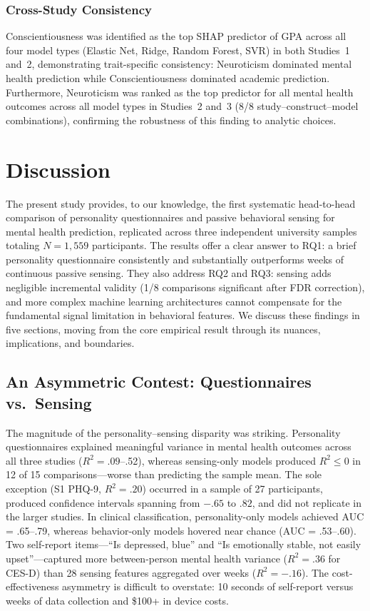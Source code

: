 \documentclass[12pt, a4paper]{article}
\begin{document}
\subsubsection{Cross-Study Consistency}

Conscientiousness was identified as the top SHAP predictor of GPA across all four model types (Elastic Net, Ridge, Random Forest, SVR) in both Studies~1 and~2, demonstrating trait-specific consistency: Neuroticism dominated mental health prediction while Conscientiousness dominated academic prediction. Furthermore, Neuroticism was ranked as the top predictor for all mental health outcomes across all model types in Studies~2 and~3 (8/8 study--construct--model combinations), confirming the robustness of this finding to analytic choices.

\section{Discussion}

The present study provides, to our knowledge, the first systematic head-to-head comparison of personality questionnaires and passive behavioral sensing for mental health prediction, replicated across three independent university samples totaling $N = 1{,}559$ participants. The results offer a clear answer to RQ1: a brief personality questionnaire consistently and substantially outperforms weeks of continuous passive sensing. They also address RQ2 and RQ3: sensing adds negligible incremental validity (1/8 comparisons significant after FDR correction), and more complex machine learning architectures cannot compensate for the fundamental signal limitation in behavioral features. We discuss these findings in five sections, moving from the core empirical result through its nuances, implications, and boundaries.

\subsection{An Asymmetric Contest: Questionnaires vs.\ Sensing}

The magnitude of the personality--sensing disparity was striking. Personality questionnaires explained meaningful variance in mental health outcomes across all three studies ($R^2 = .09$--.52), whereas sensing-only models produced $R^2 \leq 0$ in 12 of 15 comparisons---worse than predicting the sample mean. The sole exception (S1 PHQ-9, $R^2 = .20$) occurred in a sample of 27 participants, produced confidence intervals spanning from $-.65$ to $.82$, and did not replicate in the larger studies. In clinical classification, personality-only models achieved AUC = .65--.79, whereas behavior-only models hovered near chance (AUC = .53--.60). Two self-report items---``Is depressed, blue'' and ``Is emotionally stable, not easily upset''---captured more between-person mental health variance ($R^2 = .36$ for CES-D) than 28 sensing features aggregated over weeks ($R^2 = -.16$). The cost-effectiveness asymmetry is difficult to overstate: 10 seconds of self-report versus weeks of data collection and \$100+ in device costs.
\end{document}
